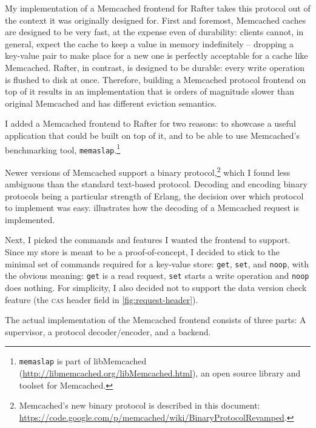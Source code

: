 \documentclass[12pt,chapterprefix=true,toc=bibliography,numbers=noendperiod,
               footnotes=multiple,twoside]{scrreprt}
\begin{document}
My implementation of a Memcached frontend for Rafter takes this protocol out of the context it was originally designed for. First and foremost, Memcached caches are designed to be very fast, at the expense even of durability: clients cannot, in general, expect the cache to keep a value in memory indefinitely -- dropping a key-value pair to make place for a new one is perfectly acceptable for a cache like Memcached. Rafter, in contrast, is designed to be durable: every write operation is flushed to disk at once. Therefore, building a Memcached protocol frontend on top of it results in an implementation that is orders of magnitude slower than original Memcached and has different eviction semantics.

I added a Memcached frontend to Rafter for two reasons: to showcase a useful application that could be built on top of it, and to be able to use Memcached's benchmarking tool, \texttt{memaslap}.\footnote{\texttt{memaslap} is part of libMemcached (\url{http://libmemcached.org/libMemcached.html}), an open source library and toolset for Memcached.}

Newer versions of Memcached support a binary protocol,\footnote{Memcached's new binary protocol is described in this document: \url{https://code.google.com/p/memcached/wiki/BinaryProtocolRevamped}.} which I found less ambiguous than the standard text-based protocol. Decoding and encoding binary protocols being a particular strength of Erlang, the decision over which protocol to implement was easy.  illustrates how the decoding of a Memcached request is implemented.

Next, I picked the commands and features I wanted the frontend to support. Since my store is meant to be a proof-of-concept, I decided to stick to the minimal set of commands required for a key-value store: \texttt{get}, \texttt{set}, and \texttt{noop}, with the obvious meaning: \texttt{get} is a read request, \texttt{set} starts a write operation and \texttt{noop} does nothing. For simplicity, I also decided not to support the data version check feature (the \textsc{cas} header field in \cref{fig:request-header}).


The actual implementation of the Memcached frontend consists of three parts: A supervisor, a protocol decoder/encoder, and a backend.
\end{document}
